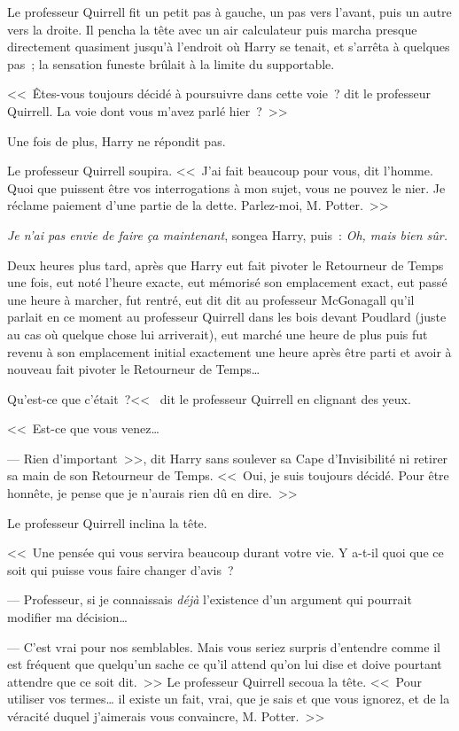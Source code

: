 Le professeur Quirrell fit un petit pas à gauche, un pas vers l'avant, puis un autre vers la droite. Il pencha la tête avec un air calculateur puis marcha presque directement quasiment jusqu'à l'endroit où Harry se tenait, et s'arrêta à quelques pas~; la sensation funeste brûlait à la limite du supportable.

<<~Êtes-vous toujours décidé à poursuivre dans cette voie~? dit le professeur Quirrell. La voie dont vous m'avez parlé hier~?~>>

Une fois de plus, Harry ne répondit pas.

Le professeur Quirrell soupira. <<~J'ai fait beaucoup pour vous, dit l'homme. Quoi que puissent être vos interrogations à mon sujet, vous ne pouvez le nier. Je réclame paiement d'une partie de la dette. Parlez-moi, M. Potter.~>>

\emph{Je n'ai pas envie de faire ça maintenant}, songea Harry, puis~: \emph{Oh, mais bien sûr.}

\later

Deux heures plus tard, après que Harry eut fait pivoter le Retourneur de Temps une fois, eut noté l'heure exacte, eut mémorisé son emplacement exact, eut passé une heure à marcher, fut rentré, eut dit dit au professeur McGonagall qu'il parlait en ce moment au professeur Quirrell dans les bois devant Poudlard (juste au cas où quelque chose lui arriverait), eut marché une heure de plus puis fut revenu à son emplacement initial exactement une heure après être parti et avoir à nouveau fait pivoter le Retourneur de Temps…

\later

Qu'est-ce que c'était~?<<~ dit le professeur Quirrell en clignant des yeux.

<<~Est-ce que vous venez…

--- Rien d'important~>>, dit Harry sans soulever sa Cape d'Invisibilité ni retirer sa main de son Retourneur de Temps. <<~Oui, je suis toujours décidé. Pour être honnête, je pense que je n'aurais rien dû en dire.~>>

Le professeur Quirrell inclina la tête.

<<~Une pensée qui vous servira beaucoup durant votre vie. Y a-t-il quoi que ce soit qui puisse vous faire changer d'avis~?

--- Professeur, si je connaissais \emph{déjà} l'existence d'un argument qui pourrait modifier ma décision…

--- C'est vrai pour nos semblables. Mais vous seriez surpris d'entendre comme il est fréquent que quelqu'un sache ce qu'il attend qu'on lui dise et doive pourtant attendre que ce soit dit.~>> Le professeur Quirrell secoua la tête. <<~Pour utiliser vos termes… il existe un fait, vrai, que je sais et que vous ignorez, et de la véracité duquel j'aimerais vous convaincre, M. Potter.~>>

